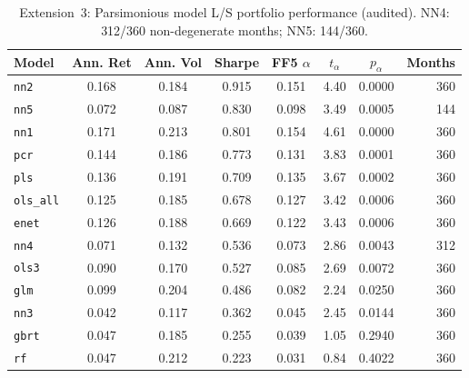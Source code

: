 \begin{table}[H]
\centering
\caption{Extension~3: Parsimonious model L/S portfolio performance (audited). NN4: 312/360 non-degenerate months; NN5: 144/360.}
\label{tab:parsimony_port}
\begin{tabular}{lccccccr}
\toprule
Model & Ann. Ret & Ann. Vol & Sharpe & FF5 $\alpha$ & $t_\alpha$ & $p_\alpha$ & Months \\
\midrule
\texttt{nn2} & 0.168 & 0.184 & 0.915 & 0.151 & 4.40 & 0.0000 & 360 \\
\texttt{nn5} & 0.072 & 0.087 & 0.830 & 0.098 & 3.49 & 0.0005 & 144 \\
\texttt{nn1} & 0.171 & 0.213 & 0.801 & 0.154 & 4.61 & 0.0000 & 360 \\
\texttt{pcr} & 0.144 & 0.186 & 0.773 & 0.131 & 3.83 & 0.0001 & 360 \\
\texttt{pls} & 0.136 & 0.191 & 0.709 & 0.135 & 3.67 & 0.0002 & 360 \\
\texttt{ols\_all} & 0.125 & 0.185 & 0.678 & 0.127 & 3.42 & 0.0006 & 360 \\
\texttt{enet} & 0.126 & 0.188 & 0.669 & 0.122 & 3.43 & 0.0006 & 360 \\
\texttt{nn4} & 0.071 & 0.132 & 0.536 & 0.073 & 2.86 & 0.0043 & 312 \\
\texttt{ols3} & 0.090 & 0.170 & 0.527 & 0.085 & 2.69 & 0.0072 & 360 \\
\texttt{glm} & 0.099 & 0.204 & 0.486 & 0.082 & 2.24 & 0.0250 & 360 \\
\texttt{nn3} & 0.042 & 0.117 & 0.362 & 0.045 & 2.45 & 0.0144 & 360 \\
\texttt{gbrt} & 0.047 & 0.185 & 0.255 & 0.039 & 1.05 & 0.2940 & 360 \\
\texttt{rf} & 0.047 & 0.212 & 0.223 & 0.031 & 0.84 & 0.4022 & 360 \\
\bottomrule
\end{tabular}
\end{table}

